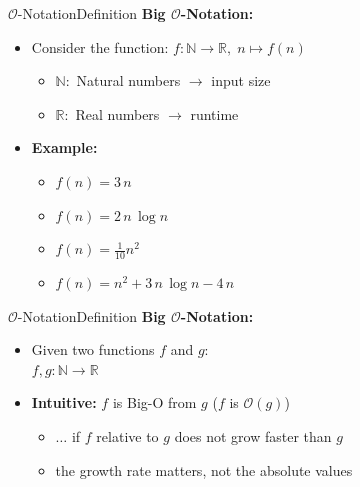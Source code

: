 
\begin{frame}{$\mathcal{O}$-Notation}{Definition}
  \textbf{Big $\mathcal{O}$-Notation:}
  \begin{itemize}
    \item
     Consider the function:
      $f\!: \mathbb{N} \to \mathbb{R}, \; n \mapsto f(n)$
      \begin{itemize}
        \item
          $\mathbb{N}\!:$ Natural numbers $\rightarrow$ input size
        \item
          $\mathbb{R}\!:$ Real numbers $\rightarrow$ runtime
      \end{itemize}
   \item
     \textbf{Example:}
     \begin{itemize}[<+- |handout:1>]
       \item
         $f(n) = 3 \, n$
       \item
         $f(n) = 2 \, n \, \log n$
       \item
         $f(n) = \frac{1}{10} n^2$
       \item
         $f(n) = n^2 + 3 \, n \, \log n - 4 \, n$
      \end{itemize}
  \end{itemize}
\end{frame}


\begin{frame}{$\mathcal{O}$-Notation}{Definition}
  \textbf{Big $\mathcal{O}$-Notation:}
  \begin{itemize}
    \item
      Given two functions $f$ and $g$:\\
      $f,g\!: \mathbb{N} \to \mathbb{R}$
    \item
      \textbf{Intuitive:} $f$ is Big-O from $g$ ($f$ is $\mathcal{O}(g)$)
      \begin{itemize}
        \item
          $\ldots$ if $f$ relative to $g$ does not grow faster than $g$
        \item
          the growth rate matters, not the absolute values
      \end{itemize}
  \end{itemize}
\end{frame}

